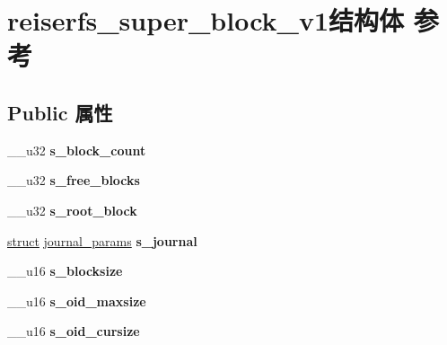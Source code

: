 \hypertarget{structreiserfs__super__block__v1}{}\section{reiserfs\+\_\+super\+\_\+block\+\_\+v1结构体 参考}
\label{structreiserfs__super__block__v1}
\subsection*{Public 属性}
\begin{DoxyCompactItemize}
\item 
\mbox{\label{structreiserfs__super__block__v1_a39c0efb5207b20b58388d18ab6190387}} 
\+\_\+\+\_\+u32 {\bfseries s\+\_\+block\+\_\+count}
\item 
\mbox{\label{structreiserfs__super__block__v1_a820793e70c1055b5195bce5cc2765953}} 
\+\_\+\+\_\+u32 {\bfseries s\+\_\+free\+\_\+blocks}
\item 
\mbox{\label{structreiserfs__super__block__v1_a2f3bdc71ab808aff0ecfd4b44279d536}} 
\+\_\+\+\_\+u32 {\bfseries s\+\_\+root\+\_\+block}
\item 
\mbox{\label{structreiserfs__super__block__v1_a3db1b22d4e9c2fc2628b0f99121e5b8d}} 
\hyperlink{interfacestruct}{struct} \hyperlink{structjournal__params}{journal\+\_\+params} {\bfseries s\+\_\+journal}
\item 
\mbox{\label{structreiserfs__super__block__v1_a93747380706dffffd342c8f99a2e9cbc}} 
\+\_\+\+\_\+u16 {\bfseries s\+\_\+blocksize}
\item 
\mbox{\label{structreiserfs__super__block__v1_ad4c39560738d127eec4ccc6a3abdc62f}} 
\+\_\+\+\_\+u16 {\bfseries s\+\_\+oid\+\_\+maxsize}
\item 
\mbox{\label{structreiserfs__super__block__v1_aaa264528b86050ab651997f6ffebe17d}} 
\+\_\+\+\_\+u16 {\bfseries s\+\_\+oid\+\_\+cursize}
\item 
\mbox{\label{structreiserfs__super__block__v1_ade9bb1f824dedfc4adf534cc3413c002}} 

\end{DoxyCompactItemize}

